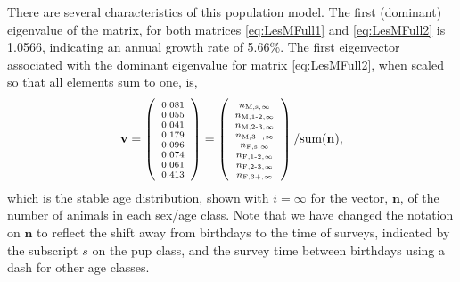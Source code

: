 \documentclass[12pt, titlepage]{article}\usepackage[]{graphicx}\usepackage[]{color}
\newcommand{\bn}{\ensuremath{{\boldsymbol{\eta}}}}
\def\bn{\mathbf{n}}
\def\bv{\mathbf{v}}
\begin{document}
There are several characteristics of this population model.  The first (dominant) eigenvalue of the matrix, for both matrices \ref{eq:LesMFull1} and \ref{eq:LesMFull2} is 1.0566, indicating an annual growth rate of 5.66\%. The first eigenvector associated with the dominant eigenvalue for matrix \ref{eq:LesMFull2}, when scaled so that all elements sum to one, is,
\begin{equation}\label{eq:evFull2}
  \bv =  \left( \mbox{\scriptsize$\begin{array}{c}
 0.081 \\ 
  0.055 \\ 
  0.041 \\ 
  0.179 \\ 
  0.096 \\ 
  0.074 \\ 
  0.061 \\ 
  0.413 \\ 
  
  \end{array} $} \right) =
    \left( \mbox{\scriptsize$\begin{array}{c}
    n_{\textrm{M,s},\infty} \\
    n_{\textrm{M,1-2},\infty} \\
    n_{\textrm{M,2-3},\infty} \\
    n_{\textrm{M,3+},\infty} \\
    n_{\textrm{F,s},\infty} \\
    n_{\textrm{F,1-2},\infty} \\
    n_{\textrm{F,2-3},\infty} \\
    n_{\textrm{F,3+},\infty} \\
  \end{array} $} \right)/\textrm{sum}(\bn),
\end{equation}
which is the stable age distribution, shown with $i = \infty$ for the vector, $\bn$, of the number of animals in each sex/age class.  Note that we have changed the notation on $\bn$ to reflect the shift away from birthdays to the time of surveys, indicated by the subscript $s$ on the pup class, and the survey time between birthdays using a dash for other age classes.
\end{document}
